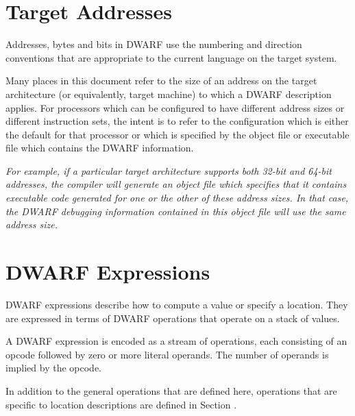 \bb
\section{Target Addresses}
\label{chap:targetaddressableunitsandaddresses}
\label{chap:targetaddresses}
\eb
{}

\bb
Addresses, bytes and bits in DWARF use the numbering and direction
conventions that are appropriate to the current language on
the target system.
\eb

Many places in this document refer to the size of an address
on the target architecture (or equivalently, target machine)
to which a DWARF description applies. For processors which
can be configured to have different address sizes or different
instruction sets, the intent is to refer to the configuration
which is either the default for that processor or which is
specified by the object file or executable file which contains
the DWARF information.

\textit{%
For example, if a particular target architecture supports
both 32-bit and 64-bit addresses, the compiler will generate
an object file which specifies that it contains executable
code generated for one or the other of these 
address sizes. In
that case, the DWARF debugging information contained in this
object file will use the same address size.}

\bbpareb

\section{DWARF Expressions}
\label{chap:dwarfexpressions}
DWARF expressions describe how to compute a value or 
\bb
specify a location.
\eb
They are expressed in
terms of DWARF operations that operate on a stack of values.

\bb
A DWARF expression is encoded as a stream of operations, 
each consisting of an opcode
\eb
followed by zero or more literal operands. 
The number of operands is 
\bb
implied 
\eb
by the opcode.  

In addition to the
general operations that are defined here, operations that are
specific to location descriptions are defined in 
Section .

